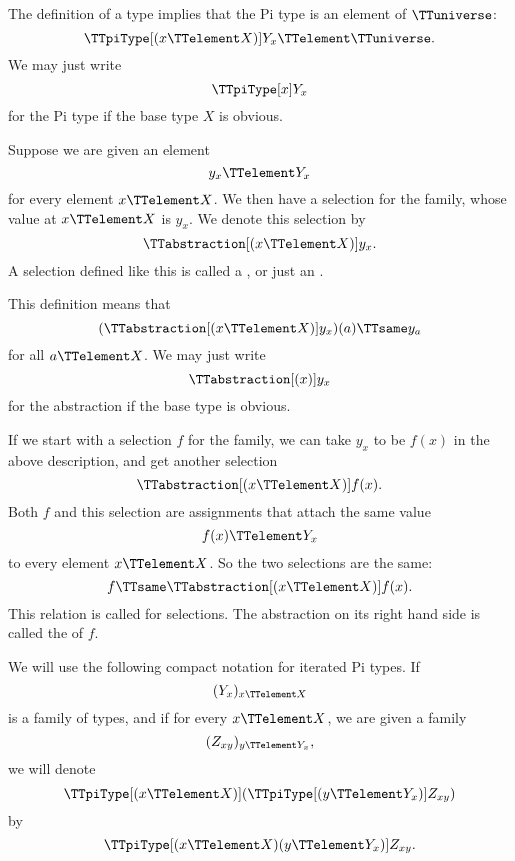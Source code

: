 \documentclass{article}
\begin{document}
The definition of a type implies that the Pi type is an element of
$\TTuniverse$:
\begin{equation*}
  \TTpiType[(x \TTelement X)] Y_x \TTelement \TTuniverse.
\end{equation*}
We may just write
\begin{equation*}
  \TTpiType[x] Y_x
\end{equation*}
for the Pi type if the base type $X$ is obvious.

Suppose we are given an element
\begin{equation*}
  y_x \TTelement Y_x
\end{equation*}
for every element $x \TTelement X$.  We then have a selection for the
family, whose value at $x \TTelement X$ is $y_x$.  We denote this
selection by
\begin{equation*}
  \TTabstraction[(x \TTelement X)] y_x.
\end{equation*}
A selection defined like this is called a
, or just an
.

This definition means that
\begin{equation*}
  (\TTabstraction[(x \TTelement X)] y_x) (a) \TTsame y_a
\end{equation*}
for all $a \TTelement X$.  We may just write
\begin{equation*}
  \TTabstraction[(x)] y_x
\end{equation*}
for the abstraction if the base type is obvious.

If we start with a selection $f$ for the family, we can take $y_x$ to
be $f(x)$ in the above description, and get another selection
\begin{equation*}
  \TTabstraction[(x \TTelement X)] f(x).
\end{equation*}
Both $f$ and this selection are assignments that attach the same value
\begin{equation*}
  f(x) \TTelement Y_x
\end{equation*}
to every element $x \TTelement X$.  So the two selections are the
same:
\begin{equation*}
  f \TTsame \TTabstraction[(x \TTelement X)] f(x).
\end{equation*}
This relation is called  for
selections.  The abstraction on its right hand side is called the
 of $f$.

We will use the following compact notation for iterated Pi types.  If
\begin{equation*}
  (Y_x)_{x \TTelement X}
\end{equation*}
is a family of types, and if for every $x \TTelement X$, we are given
a family
\begin{equation*}
  (Z_{xy})_{y \TTelement Y_x},
\end{equation*}
we will denote
\begin{equation*}
  \TTpiType[(x \TTelement X)]
  (\TTpiType[(y \TTelement Y_x)] Z_{xy})
\end{equation*}
by
\begin{equation*}
  \TTpiType[(x \TTelement X) (y \TTelement Y_x)] Z_{xy}.
\end{equation*}
\end{document}
